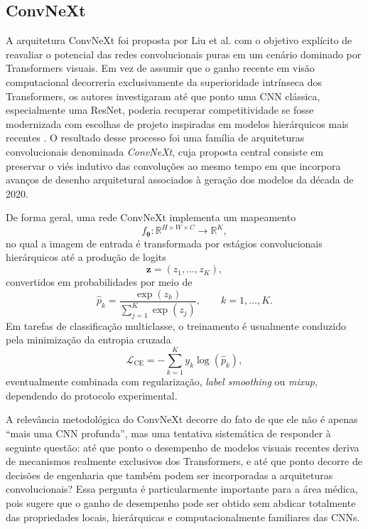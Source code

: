 \documentclass[tcc,capa]{texufpel}
\begin{document}
\subsection{ConvNeXt}

A arquitetura ConvNeXt foi proposta por Liu et al. com o objetivo explícito de reavaliar o potencial das redes convolucionais puras em um cenário dominado por Transformers visuais. Em vez de assumir que o ganho recente em visão computacional decorreria exclusivamente da superioridade intrínseca dos Transformers, os autores investigaram até que ponto uma CNN clássica, especialmente uma ResNet, poderia recuperar competitividade se fosse modernizada com escolhas de projeto inspiradas em modelos hierárquicos mais recentes \cite{Liu2022ConvNeXt}. O resultado desse processo foi uma família de arquiteturas convolucionais denominada \textit{ConvNeXt}, cuja proposta central consiste em preservar o viés indutivo das convoluções ao mesmo tempo em que incorpora avanços de desenho arquitetural associados à geração dos modelos da década de 2020.

De forma geral, uma rede ConvNeXt implementa um mapeamento
\begin{equation}
	f_{\boldsymbol{\theta}} : \mathbb{R}^{H \times W \times C} \rightarrow \mathbb{R}^{K},
\end{equation}
no qual a imagem de entrada é transformada por estágios convolucionais hierárquicos até a produção de logits
\begin{equation}
	\mathbf{z} = (z_1,\dots,z_K),
\end{equation}
convertidos em probabilidades por meio de
\begin{equation}
	\hat{p}_k = \frac{\exp(z_k)}{\sum_{j=1}^{K}\exp(z_j)},
	\qquad k=1,\dots,K.
\end{equation}
Em tarefas de classificação multiclasse, o treinamento é usualmente conduzido pela minimização da entropia cruzada
\begin{equation}
	\mathcal{L}_{\text{CE}}
	=
	-\sum_{k=1}^{K} y_k \log(\hat{p}_k),
\end{equation}
eventualmente combinada com regularização, \textit{label smoothing} ou \textit{mixup}, dependendo do protocolo experimental.

A relevância metodológica do ConvNeXt decorre do fato de que ele não é apenas “mais uma CNN profunda”, mas uma tentativa sistemática de responder à seguinte questão: até que ponto o desempenho de modelos visuais recentes deriva de mecanismos realmente exclusivos dos Transformers, e até que ponto decorre de decisões de engenharia que também podem ser incorporadas a arquiteturas convolucionais? Essa pergunta é particularmente importante para a área médica, pois sugere que o ganho de desempenho pode ser obtido sem abdicar totalmente das propriedades locais, hierárquicas e computacionalmente familiares das CNNs.
\end{document}
